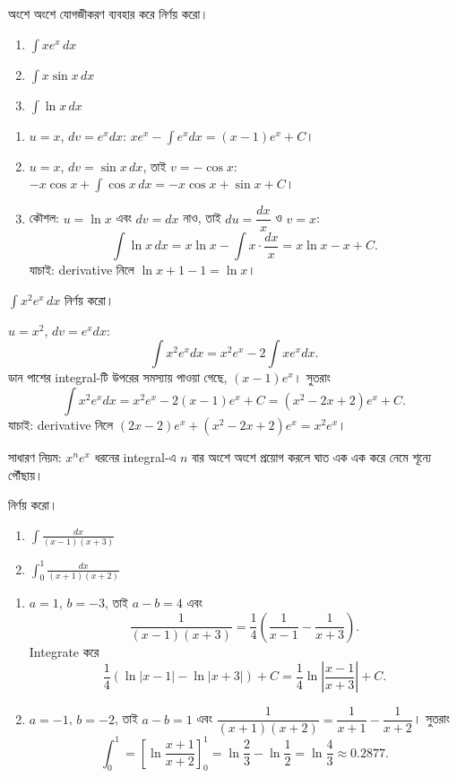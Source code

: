 \documentclass[11pt]{article}
\begin{document}
 অংশে অংশে যোগজীকরণ ব্যবহার করে নির্ণয় করো।
\begin{enumerate}
  \item $\int x e^{x}\,dx$
  \item $\int x\sin x\,dx$
  \item $\int \ln x\,dx$
\end{enumerate}

\begin{sol}
\begin{enumerate}
  \item $u = x$, $dv = e^{x}dx$: $xe^{x} - \int e^{x}dx = (x-1)e^{x}+C$।
  \item $u = x$, $dv = \sin x\,dx$, তাই $v = -\cos x$:
        $-x\cos x + \int\cos x\,dx = -x\cos x + \sin x + C$।
  \item কৌশল: $u = \ln x$ এবং $dv = dx$ নাও, তাই $du = \dfrac{dx}{x}$ ও
        $v = x$:
        \[
          \int \ln x\,dx = x\ln x - \int x \cdot \frac{dx}{x}
          = x\ln x - x + C .
        \]
        যাচাই: derivative নিলে $\ln x + 1 - 1 = \ln x$।
\end{enumerate}
\end{sol}

 $\int x^{2}e^{x}\,dx$ নির্ণয় করো।

\begin{sol}
$u = x^{2}$, $dv = e^{x}dx$:
\[
  \int x^{2}e^{x}dx = x^{2}e^{x} - 2\int xe^{x}dx .
\]
ডান পাশের integral-টি উপরের সমস্যায় পাওয়া গেছে, $(x-1)e^{x}$। সুতরাং
\[
  \int x^{2}e^{x}dx = x^{2}e^{x} - 2(x-1)e^{x} + C
  = \left( x^{2}-2x+2 \right)e^{x} + C .
\]
যাচাই: derivative নিলে $(2x-2)e^{x} + (x^{2}-2x+2)e^{x} = x^{2}e^{x}$।

সাধারণ নিয়ম: $x^{n}e^{x}$ ধরনের integral-এ $n$ বার অংশে অংশে প্রয়োগ করলে
ঘাত এক এক করে নেমে শূন্যে পৌঁছায়।
\end{sol}

 নির্ণয় করো।
\begin{enumerate}
  \item $\displaystyle\int \frac{dx}{(x-1)(x+3)}$
  \item $\displaystyle\int_{0}^{1} \frac{dx}{(x+1)(x+2)}$
\end{enumerate}

\begin{sol}
\begin{enumerate}
  \item $a = 1$, $b = -3$, তাই $a - b = 4$ এবং
        \[
          \frac{1}{(x-1)(x+3)}
          = \frac{1}{4}\left( \frac{1}{x-1} - \frac{1}{x+3} \right) .
        \]
        Integrate করে
        \[
          \frac{1}{4}\left( \ln|x-1| - \ln|x+3| \right) + C
          = \frac{1}{4}\ln\left| \frac{x-1}{x+3} \right| + C .
        \]
  \item $a = -1$, $b = -2$, তাই $a-b = 1$ এবং
        $\dfrac{1}{(x+1)(x+2)} = \dfrac{1}{x+1} - \dfrac{1}{x+2}$। সুতরাং
        \[
          \int_{0}^{1} = \left[ \ln\frac{x+1}{x+2} \right]_{0}^{1}
          = \ln\frac{2}{3} - \ln\frac{1}{2}
          = \ln\frac{4}{3} \approx 0.2877 .
        \]
\end{enumerate}
\end{sol}
\end{document}
